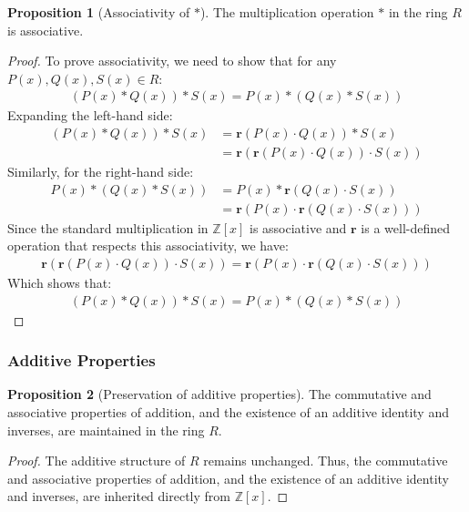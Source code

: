 \documentclass{article}
\theoremstyle{plain}
\theoremstyle{definition}
\newtheorem{proposition}{Proposition}
\newcommand{\redu}{\textbf{r}}
\newcommand{\Z}{\mathbb{Z}}
\begin{document}
\begin{proposition}[Associativity of \(\ast\)] \label{proposition:ring:2}
The multiplication operation \(\ast\) in the ring \(R\) is associative.
\end{proposition}
\begin{proof}
To prove associativity, we need to show that for any \( P(x), Q(x), S(x) \in R \):
\begin{align}
    (P(x) \ast Q(x)) \ast S(x) = P(x) \ast (Q(x) \ast S(x))
\end{align}
Expanding the left-hand side:
\begin{align}
    (P(x) \ast Q(x)) \ast S(x) &= \redu(P(x) \cdot Q(x)) \ast S(x) \\
    &= \redu(\redu(P(x) \cdot Q(x)) \cdot S(x))
\end{align}
Similarly, for the right-hand side:
\begin{align}
    P(x) \ast (Q(x) \ast S(x)) &= P(x) \ast \redu(Q(x) \cdot S(x)) \\
    &= \redu(P(x) \cdot \redu(Q(x) \cdot S(x)))
\end{align}
Since the standard multiplication in \(\Z[x]\) is associative and \(\redu\) is a well-defined operation that respects this associativity, we have:
\begin{align}
    \redu(\redu(P(x) \cdot Q(x)) \cdot S(x)) = \redu(P(x) \cdot \redu(Q(x) \cdot S(x)))
\end{align}
Which shows that:
\begin{align}
    (P(x) \ast Q(x)) \ast S(x) = P(x) \ast (Q(x) \ast S(x))
\end{align}
\end{proof}

\subsubsection{Additive Properties}
\begin{proposition}[Preservation of additive properties] \label{proposition:ring:3}
The commutative and associative properties of addition, and the existence of an additive identity and inverses, are maintained in the ring \(R\). 
\end{proposition}
\begin{proof}
The additive structure of \(R\) remains unchanged. Thus, the commutative and associative properties of addition, and the existence of an additive identity and inverses, are inherited directly from \( \Z[x] \).
\end{proof}
\end{document}
